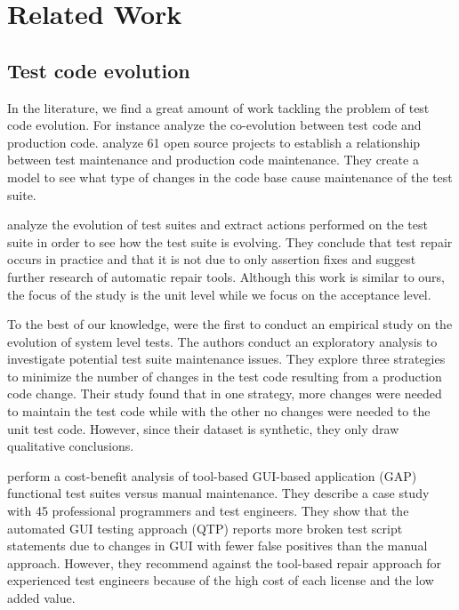 \chapter{Related Work}
\label{chap:related-work}

\section{Test code evolution}
\label{related-evolution}

In the literature, we find a great amount of work tackling the problem of test code evolution. For instance \textcite{Zaidman2011, Levin2017} analyze the co-evolution between test code and production code. \textcite{Levin2017} analyze 61 open source projects to establish a relationship between test maintenance and production code maintenance. They create a model to see what type of changes in the code base cause maintenance of the test suite.

\textcite{Pinto2012} analyze the evolution of test suites and extract actions performed on the test suite in order to see how the test suite is evolving. They conclude that test repair occurs in practice and that it is not due to only assertion fixes and suggest further research of automatic repair tools. Although this work is similar to ours, the focus of the study is the unit level while we focus on the acceptance level.

To the best of our knowledge, \textcite{Skoglund2004} were the first to conduct an empirical study on the evolution of system level tests. The authors conduct an exploratory analysis to investigate potential test suite maintenance issues. They explore three strategies to minimize the number of changes in the test code resulting from a production code change. Their study found that in one strategy, more changes were needed to maintain the test code while with the other no changes were needed to the unit test code. However, since their dataset is synthetic, they only draw qualitative conclusions.

\textcite{Grechanik2009} perform a cost-benefit analysis of tool-based GUI-based application (GAP) functional test suites versus manual maintenance. They describe a case study with 45 professional programmers and test engineers. They show that the automated GUI testing approach (QTP) reports more broken test script statements due to changes in GUI with fewer false positives than the manual approach. However, they recommend against the tool-based repair approach for experienced test engineers because of the high cost of each license and the low added value.

